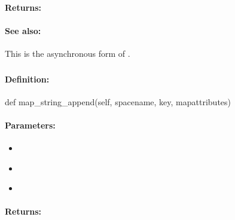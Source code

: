 \paragraph{Returns:}


\paragraph{See also:}  This is the asynchronous form of .

\pagebreak
\subsubsection{}
\label{api:python:map_string_append}


\paragraph{Definition:}
\begin{pythoncode}
def map_string_append(self, spacename, key, mapattributes)
\end{pythoncode}

\paragraph{Parameters:}
\begin{itemize}[noitemsep]
\item {}\\

\item {}\\

\item {}\\

\end{itemize}

\paragraph{Returns:}


\pagebreak
\subsubsection{}
\label{api:python:async_map_string_append}


